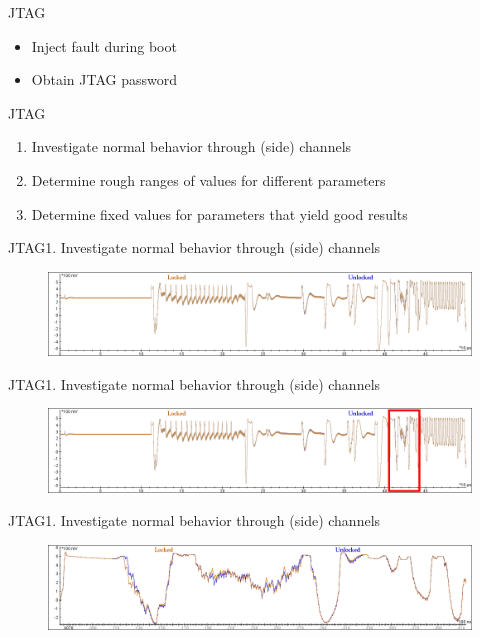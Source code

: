 \documentclass[table]{beamer}
\begin{document}
\begin{frame}{JTAG}
    \begin{itemize}
        \item Inject fault during boot
        \item Obtain JTAG password
    \end{itemize}
\end{frame}

\begin{frame}{JTAG}
    \begin{enumerate}
        \item Investigate normal behavior through (side) channels 
        \item Determine rough ranges of values for different parameters
        \item Determine fixed values for parameters that yield good results
    \end{enumerate}
\end{frame}


\begin{frame}{JTAG}{1. Investigate normal behavior through (side) channels }
    \begin{figure}[H]
      \centering
      \includegraphics[width=\textwidth]{../plots/tms57-trace1.png}
    \end{figure}
\end{frame}

\begin{frame}{JTAG}{1. Investigate normal behavior through (side) channels }
    \begin{figure}[H]
      \centering
      \includegraphics[width=\textwidth]{../plots/tms57-trace1-2.png}
    \end{figure}
\end{frame}

\begin{frame}{JTAG}{1. Investigate normal behavior through (side) channels }
    \begin{figure}[H]
      \centering
      \includegraphics[width=\textwidth]{../plots/tms57-trace2.png}
    \end{figure}
\end{frame}
\end{document}
